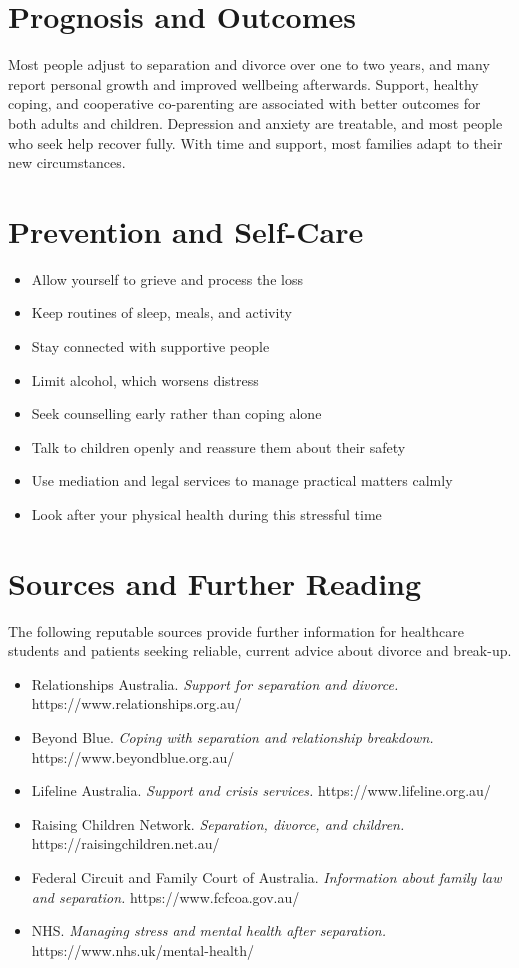 \section*{Prognosis and Outcomes}
Most people adjust to separation and divorce over one to two years, and many report personal growth and improved wellbeing afterwards. Support, healthy coping, and cooperative co-parenting are associated with better outcomes for both adults and children. Depression and anxiety are treatable, and most people who seek help recover fully. With time and support, most families adapt to their new circumstances.

\section*{Prevention and Self-Care}
\begin{itemize}
    \item Allow yourself to grieve and process the loss
    \item Keep routines of sleep, meals, and activity
    \item Stay connected with supportive people
    \item Limit alcohol, which worsens distress
    \item Seek counselling early rather than coping alone
    \item Talk to children openly and reassure them about their safety
    \item Use mediation and legal services to manage practical matters calmly
    \item Look after your physical health during this stressful time
\end{itemize}

\section*{Sources and Further Reading}
The following reputable sources provide further information for healthcare students and patients seeking reliable, current advice about divorce and break-up.

\begin{itemize}
    \item Relationships Australia. \textit{Support for separation and divorce.} https://www.relationships.org.au/
    \item Beyond Blue. \textit{Coping with separation and relationship breakdown.} https://www.beyondblue.org.au/
    \item Lifeline Australia. \textit{Support and crisis services.} https://www.lifeline.org.au/
    \item Raising Children Network. \textit{Separation, divorce, and children.} https://raisingchildren.net.au/
    \item Federal Circuit and Family Court of Australia. \textit{Information about family law and separation.} https://www.fcfcoa.gov.au/
    \item NHS. \textit{Managing stress and mental health after separation.} https://www.nhs.uk/mental-health/
\end{itemize}
